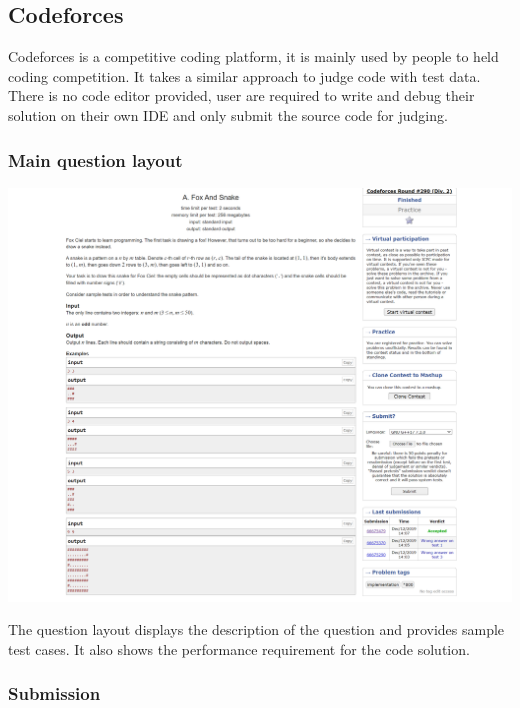 \documentclass{report}
\begin{document}
\subsection{Codeforces}

Codeforces is a competitive coding platform, it is mainly used by people to held coding competition. It takes a similar approach to judge code with test data. There is no code editor provided, user are required to write and debug their solution on their own IDE and only submit the source code for judging.

\subsubsection{Main question layout}

\includegraphics[width=\linewidth]{Problem-A-Codeforces}

The question layout displays the description of the question and provides sample test cases. It also shows the performance requirement for the code solution.

\subsubsection{Submission}
\end{document}
